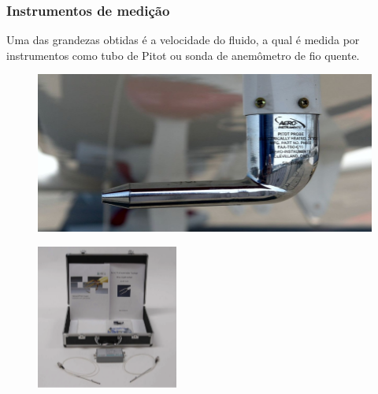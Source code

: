 \begin{frame}
\frametitle{Instrumentos de medição}

Uma das grandezas obtidas é a velocidade do fluido, a qual é medida por instrumentos como tubo de Pitot ou sonda de anemômetro de fio quente.

\begin{figure}
\centering
\includegraphics[scale = 0.8]{figs/tubodepitotaviao}
\end{figure}

\begin{figure}
\centering
\includegraphics[scale = 0.8]{figs/sonda}
\end{figure}
    
\end{frame}
